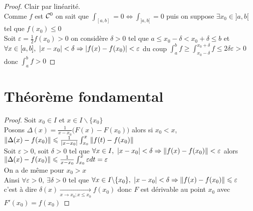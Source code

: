 		\begin{proof}
		\fbox{$\Rightarrow$} Clair par linéarité. \\ 
		\fbox{$\Leftarrow$} Comme $f$ est ${\mathcal{C}}^0$ on sait que $\int_{[a,b]} =0 \Leftrightarrow \int_{]a,b[} =0$ puis on suppose $\exists x_0 \in ]a,b[$ tel que $f(x_0) \leqslant 0$\\
		Soit $\varepsilon = \frac{1}{2} f(x_0) >0$ on considère $\delta >0$ tel que $a\leqslant x_0 -\delta < x_0+\delta \leqslant b$ et\\ 
		$\forall x\in [a,b],~\left\vert x-x_0 \right\vert < \delta \Rightarrow \left\vert f(x)-f(x_0) \right\vert <\varepsilon$ du coup $\int_a^b f \geqslant \int_{x_0-\delta}^{x_0+\delta} f \leqslant 2\delta\varepsilon >0$ donc $\int_a^b f >0$
		\end{proof} \medskip
		
		 \medskip
		
		
\section{Théorème fondamental}

    
    \begin{proof}
    Soit $x_0 \in I$ et $x\in I\backslash \{x_0\}$ \\
    Posons $\Delta (x) = \frac{1}{x-x_0}\big( F(x) - F(x_0)\big)$ alors si $x_0<x$, $\left\Vert \Delta (x) - f(x_0) \right\Vert \leqslant  \frac{1}{\left\vert x-x_0 \right\vert} \int_{x_0}^x \left\Vert f(t) - f(x_0) \right\Vert$ \\ 
    Soit $\varepsilon >0 $, soit $\delta >0$ tel que $\forall x\in I ,~\left\vert x-x_0 \right\vert <\delta \Rightarrow \left\Vert f(x)-f(x_0) \right\Vert <\varepsilon$ alors \\
    $\left\Vert \Delta (x) - f(x_0) \right\Vert \leqslant \frac{1}{x-x_0} \int_{x_0}^x \varepsilon dt = \varepsilon$ \\ 
    On a de même pour $x_0 > x$ \\
    Ainsi $\forall \varepsilon > 0 ,~\exists \delta >0$ tel que $\forall x\in I \backslash \{x_0\} ,~\left\vert x-x_0 \right\vert <\delta \Rightarrow \left\Vert f(x) - f(x_0) \right\Vert \leqslant \varepsilon$ c'est à dire $\delta (x) \underset{x\rightarrow x_0 ; x\leqslant x_0}{\longrightarrow} f(x_0)$ donc $F$ est dérivable au point $x_0$ avec $F'(x_0) = f(x_0)$
    \end{proof} \medskip
    

